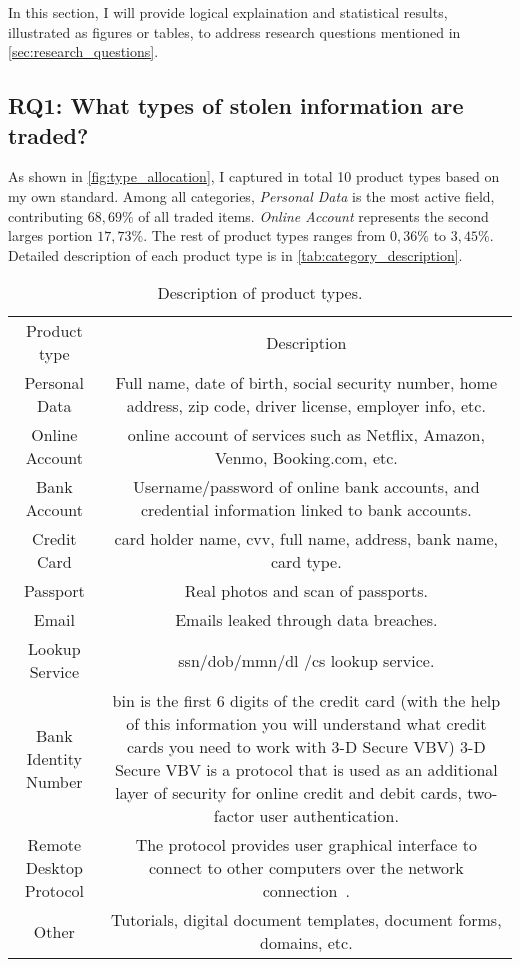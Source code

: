In this section, I will provide logical explaination and statistical results,
illustrated as figures or tables, to address research questions mentioned in
\autoref{sec:research_questions}.

\subsection{RQ1: What types of stolen information are traded?}
%
As shown in \autoref{fig:type_allocation}, I captured in total 10 product types
based on my own standard. Among all categories, \emph{Personal Data} is the
most active field, contributing \(68,69\%\) of all traded items. \emph{Online Account}
represents the second larges portion \(17,73\%\). The rest of product types ranges
from \(0,36\%\) to \(3,45\%\). Detailed description of each product type is in
\autoref{tab:category_description}.

\begin{table}
    \centering
    \begin{tabular}{|c|c|}
        \hline
        Product type & Description\\
        Personal Data & Full name, date of birth, social security number, home
        address, zip code, driver license, employer info, etc.\\
        Online Account & online account of services such as Netflix, Amazon,
        Venmo, Booking.com, etc.\\
        Bank Account & Username/password of online bank accounts, and credential
        information linked to bank accounts.\\
        Credit Card & card holder name, \acrshort{cvv}, full name, address,
        bank name, card type.\\
        Passport & Real photos and scan of passports.\\
        Email & Emails leaked through data breaches.\\
        Lookup Service & \acrshort{ssn}/\acrshort{dob}/\acrshort{mmn}/\acrshort{dl}
        /\acrshort{cs} lookup service.\\
        Bank Identity Number & \acrshort{bin} is the first 6 digits of the credit card (with
        the help of this information you will understand what credit cards you need to
        work with 3-D Secure VBV) 3-D Secure VBV is a protocol that is used as an
        additional layer of security for online credit and debit cards, two-factor
        user authentication.\\
        Remote Desktop Protocol & The protocol provides user graphical interface to connect
        to other computers over the network connection~\cite{web:rdp_wiki}.\\
        Other & Tutorials, digital document templates, document forms, domains, etc.\\
        \hline
    \end{tabular}
    \caption{Description of product types.}\label{tab:category_description}
\end{table}

